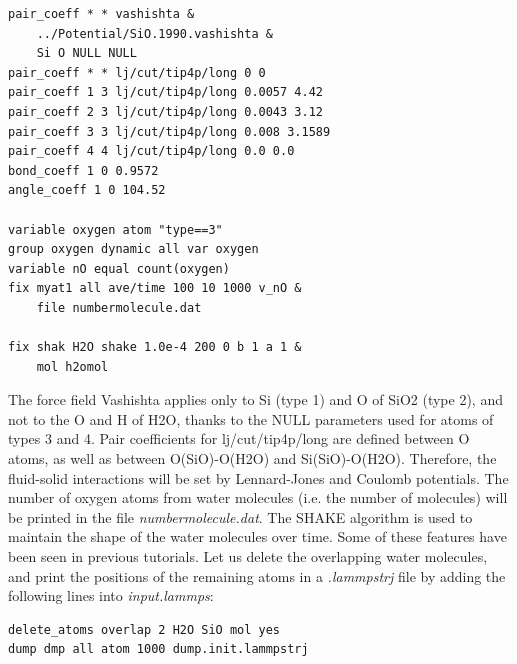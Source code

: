 \documentclass[9pt,tutorial]{livecoms}
\begin{document}
{\normalsize \begin{verbatim}
pair_coeff * * vashishta & 
    ../Potential/SiO.1990.vashishta &
    Si O NULL NULL
pair_coeff * * lj/cut/tip4p/long 0 0
pair_coeff 1 3 lj/cut/tip4p/long 0.0057 4.42
pair_coeff 2 3 lj/cut/tip4p/long 0.0043 3.12
pair_coeff 3 3 lj/cut/tip4p/long 0.008 3.1589
pair_coeff 4 4 lj/cut/tip4p/long 0.0 0.0
bond_coeff 1 0 0.9572
angle_coeff 1 0 104.52

variable oxygen atom "type==3"
group oxygen dynamic all var oxygen
variable nO equal count(oxygen)
fix myat1 all ave/time 100 10 1000 v_nO &
    file numbermolecule.dat

fix shak H2O shake 1.0e-4 200 0 b 1 a 1 &
    mol h2omol
\end{verbatim}}
The force field Vashishta applies only to Si (type 1) and O of SiO2 (type 2), and not to the O and H of H2O, thanks to the NULL parameters used for atoms of types 3 and 4. Pair coefficients for lj/cut/tip4p/long are defined between O atoms, as well as between O(SiO)-O(H2O) and Si(SiO)-O(H2O). Therefore, the fluid-solid interactions will be set by Lennard-Jones and Coulomb potentials. The number of oxygen atoms from water molecules (i.e. the number of molecules) will be printed in the file \textit{numbermolecule.dat}. The SHAKE algorithm is used to maintain the shape of the water molecules over time. Some of
these features have been seen in previous tutorials. Let us delete the overlapping water molecules, and print the
positions of the remaining atoms in a \textit{.lammpstrj} file by adding the following lines into \textit{input.lammps}:
{\normalsize \begin{verbatim}
delete_atoms overlap 2 H2O SiO mol yes
dump dmp all atom 1000 dump.init.lammpstrj
\end{verbatim}}
\end{document}

